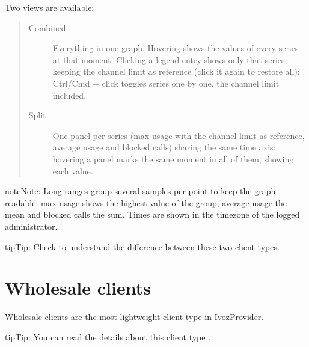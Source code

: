 \documentclass[letterpaper,10pt,english]{sphinxmanual}
\begin{document}
Two views are available:
\begin{quote}
\begin{description}
\item[{Combined}] \leavevmode
Everything in one graph. Hovering shows the values of every series at that moment. Clicking a legend entry
shows only that series, keeping the channel limit as reference (click it again to restore all); Ctrl/Cmd +
click toggles series one by one, the channel limit included.

\item[{Split}] \leavevmode
One panel per series (max usage with the channel limit as reference, average usage and blocked calls) sharing
the same time axis: hovering a panel marks the same moment in all of them, showing each value.

\end{description}
\end{quote}

\begin{notice}{note}{Note:}
Long ranges group several samples per point to keep the graph readable: max usage shows the highest value
of the group, average usage the mean and blocked calls the sum. Times are shown in the timezone of the
logged administrator.
\end{notice}

\begin{notice}{tip}{Tip:}
Check {\hyperref[administration_portal/brand/clients/retail:differences\string-between\string-retail\string-and\string-residential\string-clients]{}} to understand the difference between these two
client types.
\end{notice}
\label{administration_portal/client/wholesale/index:wholesale-clients}

\section{Wholesale clients}
\label{administration_portal/client/wholesale/index:clientes-wholesale}\label{administration_portal/client/wholesale/index:wholesale-clients}\label{administration_portal/client/wholesale/index::doc}\label{administration_portal/client/wholesale/index:id1}
Wholesale clients are the most lightweight client type in IvozProvider.

\begin{notice}{tip}{Tip:}
You can read the details about this client type {\hyperref[administration_portal/brand/clients/wholesale:wholesale\string-clients]{}}.
\end{notice}
\end{document}
